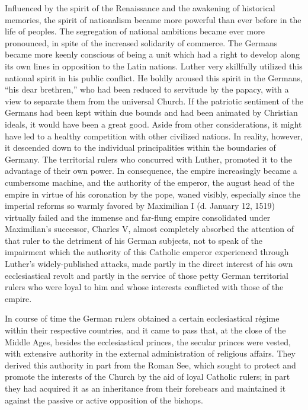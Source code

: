 Influenced by the spirit of the Renaissance and the awakening of
historical memories, the spirit of nationalism became more powerful
than ever before in the life of peoples. The segregation of national
ambitions became ever more pronounced, in spite of the increased
solidarity of commerce. The Germans became more keenly conscious of
being a unit which had a right to develop along its own
lines in opposition to the Latin nations. Luther very skillfully utilized
this national spirit in his public conflict. He boldly aroused this
spirit in the Germans, “his dear brethren,” who had been reduced
to servitude by the papacy, with a view to separate them from the
universal Church. If the patriotic sentiment of the Germans had
been kept within due bounds and had been animated by Christian
ideals, it would have been a great good. Aside from other considerations,
it might have led to a healthy competition with other civilized
nations. In reality, however, it descended down to the individual
principalities within the boundaries of Germany. The territorial
rulers who concurred with Luther, promoted it to the advantage of
their own power. In consequence, the empire increasingly became
a cumbersome machine, and the authority of the emperor, the august
head of the empire in virtue of his coronation by the pope, waned
visibly, especially since the imperial reforms so warmly favored by
Maximilian I (d. January 12, 1519) virtually failed and the immense
and far-flung empire consolidated under Maximilian’s successor,
Charles V, almost completely absorbed the attention of that ruler to
the detriment of his German subjects, not to speak of the impairment
which the authority of this Catholic emperor experienced
through Luther’s widely-published attacks, made partly in the direct
interest of his own ecclesiastical revolt and partly in the service of
those petty German territorial rulers who were loyal to him and
whose interests conflicted with those of the empire.

In course of time the German rulers obtained a certain ecclesiastical
régime within their respective countries, and it came to pass
that, at the close of the Middle Ages, besides the ecclesiastical princes,
the secular princes were vested, with extensive authority in the external
administration of religious affairs. They derived this authority
in part from the Roman See, which sought to protect and promote
the interests of the Church by the aid of loyal Catholic rulers; in
part they had acquired it as an inheritance from their forebears and
maintained it against the passive or active opposition of the bishops.

